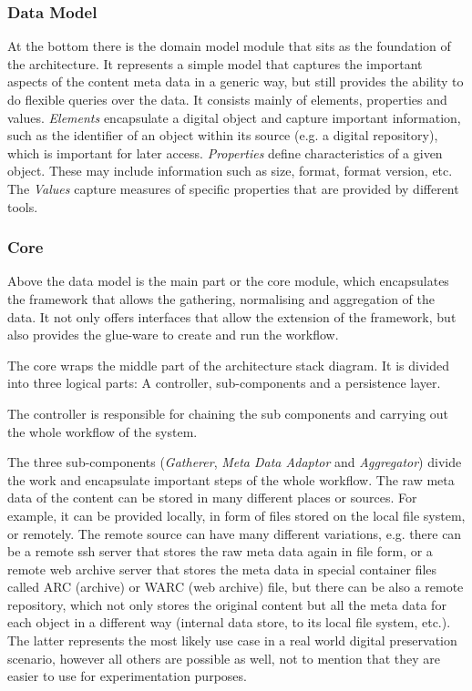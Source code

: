 \subsubsection{Data Model}

At the bottom there is the domain model module that sits as the foundation of the architecture. It represents a simple model that captures the important aspects of the content meta data in a generic way, but still provides the ability to do flexible queries over the data. It consists mainly of elements, properties and values. \textit{Elements} encapsulate a digital object and capture important information, such as the identifier of an object within its source (e.g. a digital repository), which is important for later access. \textit{Properties} define characteristics of a given object. These may include information such as size, format, format version, etc. The \textit{Values} capture measures of specific properties that are provided by different tools.

\subsubsection{Core}
Above the data model is the main part or the core module, which encapsulates the framework that allows the gathering, normalising and aggregation of the data. It not only offers interfaces that allow the extension of the framework, but also provides the glue-ware to create and run the workflow.

The core wraps the middle part of the architecture stack diagram. It is divided into three logical parts: A controller, sub-components and a persistence layer.

The controller is responsible for chaining the sub components and carrying out the whole workflow of the system.

The three sub-components (\textit{Gatherer}, \textit{Meta Data Adaptor} and \textit{Aggregator}) divide the work and encapsulate important steps of the whole workflow. The raw meta data of the content can be stored in many different places or sources. For example, it can be provided locally, in form of files stored on the local file system, or remotely. The remote source can have many different variations, e.g. there can be a remote ssh server that stores the raw meta data again in file form, or a remote web archive server that stores the meta data in special container files called ARC (archive) or WARC (web archive) file, but there can be also a remote repository, which not only stores the original content but all the meta data for each object in a different way (internal data store, to its local file system, etc.). The latter represents the most likely use case in a real world digital preservation scenario, however all others are possible as well, not to mention that they are easier to use for experimentation purposes.


